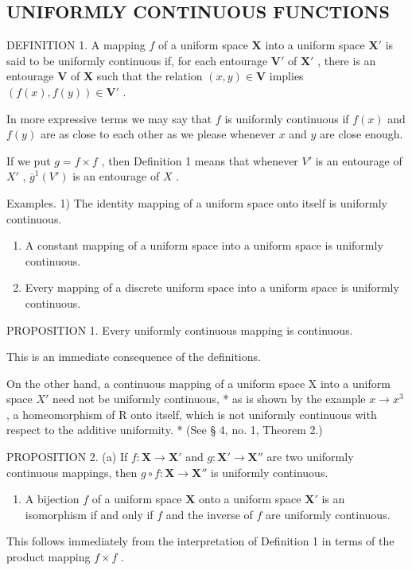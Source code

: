 \subsection{UNIFORMLY CONTINUOUS FUNCTIONS}

DEFINITION 1. A mapping \(f\) of a uniform space \(\mathbf{X}\) into a uniform space \(\mathbf{X}'\) is said to be uniformly continuous if, for each entourage \(\mathbf{V}'\) of \(\mathbf{X}'\) , there is an entourage \(\mathbf{V}\) of \(\mathbf{X}\) such that the relation \((x,y)\in \mathbf{V}\) implies \((f(x),f(y))\in \mathbf{V}'\) .

In more expressive terms we may say that \(f\) is uniformly continuous if \(f(x)\) and \(f(y)\) are as close to each other as we please whenever \(x\) and \(y\) are close enough.

If we put \(g = f \times f\) , then Definition 1 means that whenever \(V'\) is an entourage of \(X'\) , \(\overline{g}^1(V')\) is an entourage of \(X\) .

Examples. 1) The identity mapping of a uniform space onto itself is uniformly continuous.

\begin{enumerate}
\def\labelenumi{\arabic{enumi})}
\setcounter{enumi}{1}
\item
  A constant mapping of a uniform space into a uniform space is uniformly continuous.
\item
  Every mapping of a discrete uniform space into a uniform space is uniformly continuous.
\end{enumerate}

PROPOSITION 1. Every uniformly continuous mapping is continuous.

This is an immediate consequence of the definitions.

On the other hand, a continuous mapping of a uniform space X into a uniform space \(X'\) need not be uniformly continuous, * as is shown by the example \(x \to x^{3}\) , a homeomorphism of R onto itself, which is not uniformly continuous with respect to the additive uniformity. * (See § 4, no. 1, Theorem 2.)

PROPOSITION 2. (a) If \(f: \mathbf{X} \to \mathbf{X}'\) and \(g: \mathbf{X}' \to \mathbf{X}''\) are two uniformly continuous mappings, then \(g \circ f: \mathbf{X} \to \mathbf{X}''\) is uniformly continuous.

\begin{enumerate}
\def\labelenumi{(\alph{enumi})}
\setcounter{enumi}{1}
\tightlist
\item
  A bijection \(f\) of a uniform space \(\mathbf{X}\) onto a uniform space \(\mathbf{X}'\) is an isomorphism if and only if \(f\) and the inverse of \(f\) are uniformly continuous.
\end{enumerate}

This follows immediately from the interpretation of Definition 1 in terms of the product mapping \(f \times f\) .

